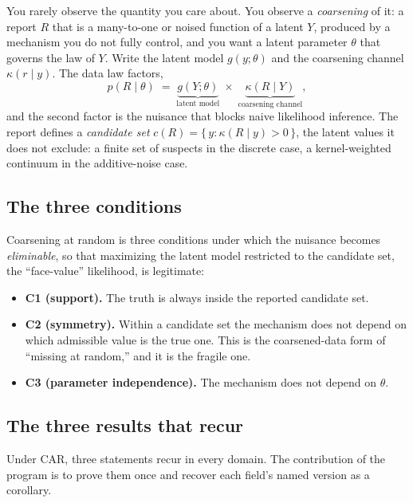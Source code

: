 \documentclass[11pt]{article}
\newcommand{\given}{\mid}
\begin{document}
You rarely observe the quantity you care about. You observe a \emph{coarsening} of
it: a report $R$ that is a many-to-one or noised function of a latent $Y$, produced
by a mechanism you do not fully control, and you want a latent parameter $\theta$
that governs the law of $Y$. Write the latent model $g(y;\theta)$ and the coarsening
channel $\kappa(r \given y)$. The data law factors,
\begin{equation*}
  p(R \given \theta)
  \;=\; \underbrace{g(Y;\theta)}_{\text{latent model}}
        \;\times\;
        \underbrace{\kappa(R \given Y)}_{\text{coarsening channel}},
\end{equation*}
and the second factor is the nuisance that blocks naive likelihood inference. The
report defines a \emph{candidate set} $c(R) = \{\, y : \kappa(R \given y) > 0 \,\}$,
the latent values it does not exclude: a finite set of suspects in the discrete
case, a kernel-weighted continuum in the additive-noise case.

\subsection{The three conditions}

Coarsening at random \citep[CAR;][]{heitjan1991ignorability, gill1997coarsening}
is three conditions under which the nuisance becomes \emph{eliminable}, so
that maximizing the latent model restricted to the candidate set, the
``face-value'' likelihood, is legitimate:

\begin{itemize}
\item \textbf{C1 (support).} The truth is always inside the reported candidate set.
\item \textbf{C2 (symmetry).} Within a candidate set the mechanism does not depend
  on which admissible value is the true one. This is the coarsened-data form of
  ``missing at random,'' and it is the fragile one.
\item \textbf{C3 (parameter independence).} The mechanism does not depend on
  $\theta$.
\end{itemize}

\subsection{The three results that recur}

Under CAR, three statements recur in every domain. The contribution of the program
is to prove them once and recover each field's named version as a corollary.
\end{document}
